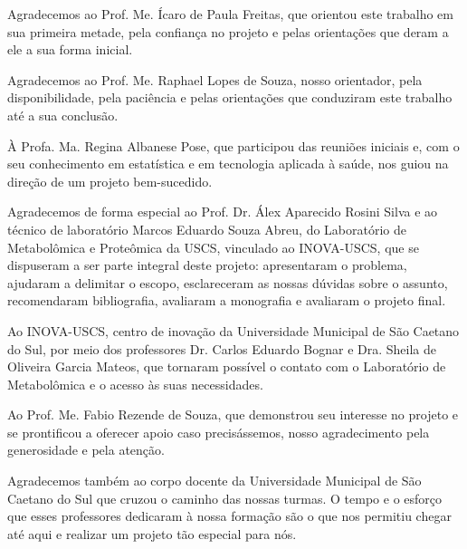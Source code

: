 
\begin{agradecimentos}

Agradecemos ao Prof. Me. Ícaro de Paula Freitas, que orientou este trabalho em sua primeira metade, pela confiança no projeto e pelas orientações que deram a ele a sua forma inicial.

Agradecemos ao Prof. Me. Raphael Lopes de Souza, nosso orientador, pela disponibilidade, pela paciência e pelas orientações que conduziram este trabalho até a sua conclusão.

À Profa. Ma. Regina Albanese Pose, que participou das reuniões iniciais e, com o seu conhecimento em estatística e em tecnologia aplicada à saúde, nos guiou na direção de um projeto bem-sucedido.

Agradecemos de forma especial ao Prof. Dr. Álex Aparecido Rosini Silva e ao técnico de laboratório Marcos Eduardo Souza Abreu, do Laboratório de Metabolômica e Proteômica da USCS, vinculado ao INOVA-USCS, que se dispuseram a ser parte integral deste projeto: apresentaram o problema, ajudaram a delimitar o escopo, esclareceram as nossas dúvidas sobre o assunto, recomendaram bibliografia, avaliaram a monografia e avaliaram o projeto final.

Ao INOVA-USCS, centro de inovação da Universidade Municipal de São Caetano do Sul, por meio dos professores Dr. Carlos Eduardo Bognar e Dra. Sheila de Oliveira Garcia Mateos, que tornaram possível o contato com o Laboratório de Metabolômica e o acesso às suas necessidades.

Ao Prof. Me. Fabio Rezende de Souza, que demonstrou seu interesse no projeto e se prontificou a oferecer apoio caso precisássemos, nosso agradecimento pela generosidade e pela atenção.

Agradecemos também ao corpo docente da Universidade Municipal de São Caetano do Sul que cruzou o caminho das nossas turmas. O tempo e o esforço que esses professores dedicaram à nossa formação são o que nos permitiu chegar até aqui e realizar um projeto tão especial para nós.

\end{agradecimentos}



